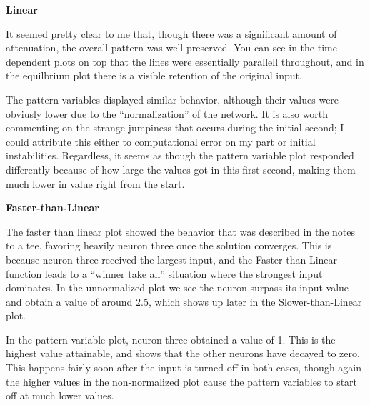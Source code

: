 \documentclass[a4paper,12pt]{article}
\begin{document}
\bigskip
{\bf Linear}
\bigskip
\begin{figure}[h!]
\end{figure}

\begin{figure}[h!]
\begin{center}
\end{center}
\end{figure}

\vfil\eject

It seemed pretty clear to me that, though there was a significant amount of attenuation, the overall pattern was well preserved. You can see in the time-dependent plots on top that the lines were essentially parallell throughout, and in the equilbrium plot there is a visible retention of the original input. 

\vspace{2mm}

The pattern variables displayed similar behavior, although their values were obviusly lower due to the ``normalization'' of the network. It is also worth commenting on the strange jumpiness that occurs during the initial second; I could attribute this either to computational error on my part or initial instabilities. Regardless, it seems as though the pattern variable plot responded differently because of how large the values got in this first second, making them much lower in value right from the start. 

\bigskip

{\bf Faster-than-Linear}

\bigskip

The faster than linear plot showed the behavior that was described in the notes to a tee, favoring heavily neuron three once the solution converges. This is because neuron three received the largest input, and the Faster-than-Linear function leads to a ``winner take all'' situation where the strongest input dominates. In the unnormalized plot we see the neuron surpass its input value and obtain a value of around $2.5$, which shows up later in the Slower-than-Linear plot. 

\vspace{2mm}

In the pattern variable plot, neuron three obtained a value of 1. This is the highest value attainable, and shows that the other neurons have decayed to zero. This happens fairly soon after the input is turned off in both cases, though again the higher values in the non-normalized plot cause the pattern variables to start off at much lower values. 
\end{document}
